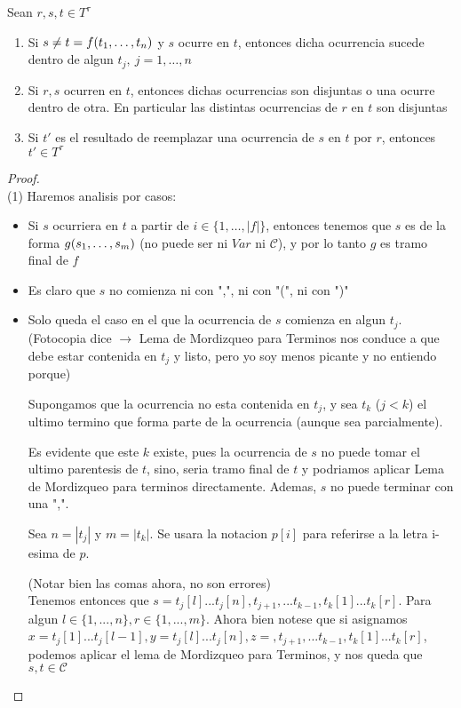 \begin{lemma}
  Sean $r, s, t \in T^\tau$
  \begin{enumerate}
    \item Si $s \neq t = f(t_{1}, \dots, t_{n})$ y $s$ ocurre en $t$, entonces dicha ocurrencia sucede dentro de algun $t_j,\ j = 1, \dots, n$
    \item Si $r, s$ ocurren en $t$, entonces dichas ocurrencias son disjuntas o una ocurre dentro de otra. En particular las distintas ocurrencias de $r$ en $t$ son disjuntas
    \item Si $t'$ es el resultado de reemplazar una ocurrencia de $s$ en $t$ por $r$, entonces $t' \in T^\tau$
  \end{enumerate}
\end{lemma}
\begin{proof}
  $ $\\
  (1) Haremos analisis por casos:
  \begin{itemize}
    \item Si $s$ ocurriera en $t$ a partir de $i\in\{1,\dots,|f|\}$, entonces tenemos que $s$ es de la forma $g(s_{1}, \dots, s_{m})$ (no puede ser ni $Var$ ni $\mathcal{C}$), y por lo tanto $g$ es tramo final de $f$ \abs
    \item Es claro que $s$ no comienza ni con ",", ni con "(", ni con ")"
    \item 
    Solo queda el caso en el que la ocurrencia de $s$ comienza en algun $t_j$. (Fotocopia dice $\rightarrow$ Lema de Mordizqueo para Terminos nos conduce a que debe estar contenida en $t_j$ y listo, pero yo soy menos picante y no entiendo porque)
    
    Supongamos que la ocurrencia no esta contenida en $t_j$, y sea $t_k$ ($j<k$) el ultimo termino que forma parte de la ocurrencia (aunque sea parcialmente).
    
    Es evidente que este $k$ existe, pues la ocurrencia de $s$ no puede tomar el ultimo parentesis de $t$, sino, seria tramo final de $t$ y podriamos aplicar Lema de Mordizqueo para terminos directamente. Ademas, $s$ no puede terminar con una ",".
    
    Sea $n=|t_j|$ y $m=|t_k|$. Se usara la notacion $p[i]$ para referirse a la letra i-esima de $p$.

    (Notar bien las comas ahora, no son errores)\\
    Tenemos entonces que $s=t_j[l]... t_j[n],t_{j+1},... t_{k-1},t_k[1]... t_k[r]$. Para algun $l \in \{1,...,n\},r\in\{1,...,m\}$. Ahora bien notese que si asignamos $x = t_j[1]...t_j[l-1], y = t_j[l]...t_j[n], z = ,t_{j+1},... t_{k-1},t_k[1]... t_k[r]$, podemos aplicar 
    el lema de Mordizqueo para Terminos, y nos queda que $s,t\in \mathcal{C}$ \abs
  \end{itemize}


\end{proof}
